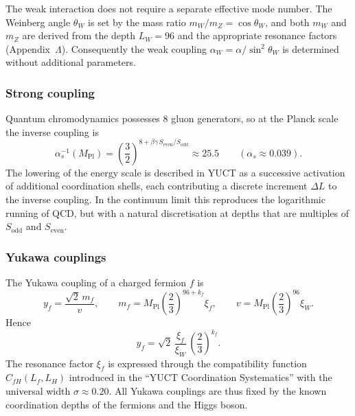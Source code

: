 \documentclass[12pt,a4paper]{article}
\begin{document}
	The weak interaction does not require a separate effective mode number.  The Weinberg angle
	\(\theta_W\) is set by the mass ratio \(m_W/m_Z = \cos\theta_W\), and both \(m_W\) and \(m_Z\)
	are derived from the depth \(L_W = 96\) and the appropriate resonance factors
	(Appendix~\(\Lambda\)).  Consequently the weak coupling \(\alpha_W = \alpha/\sin^2\theta_W\) is
	determined without additional parameters.
	
	\subsubsection{Strong coupling}
	
	Quantum chromodynamics possesses \(8\) gluon generators, so at the Planck scale the inverse
	coupling is
	\begin{equation}
		\alpha_s^{-1}(M_{\mathrm{Pl}}) = \left(\frac{3}{2}\right)^{\!8 + \beta\gamma\,S_{\mathrm{even}}/S_{\mathrm{odd}}}
		\approx 25.5 \qquad (\alpha_s \approx 0.039) .
	\end{equation}
	The lowering of the energy scale is described in YUCT as a successive activation of additional
	coordination shells, each contributing a discrete increment \(\Delta L\) to the inverse
	coupling.  In the continuum limit this reproduces the logarithmic running of QCD, but with a
	natural discretisation at depths that are multiples of \(S_{\mathrm{odd}}\) and
	\(S_{\mathrm{even}}\).
	
	\subsubsection{Yukawa couplings}
	
	The Yukawa coupling of a charged fermion \(f\) is
	\begin{equation}
		y_f = \frac{\sqrt{2}\,m_f}{v},
		\qquad
		m_f = M_{\mathrm{Pl}}\left(\frac{2}{3}\right)^{\!96+k_f}\xi_f,
		\qquad
		v   = M_{\mathrm{Pl}}\left(\frac{2}{3}\right)^{\!96}\xi_W .
	\end{equation}
	Hence
	\begin{equation}
		y_f = \sqrt{2}\,\frac{\xi_f}{\xi_W}\,\left(\frac{2}{3}\right)^{\!k_f} .
	\end{equation}
	The resonance factor \(\xi_f\) is expressed through the compatibility function
	\(C_{fH}(L_f,L_H)\) introduced in the ``YUCT Coordination Systematics'' with the universal
	width \(\sigma \approx 0.20\).  All Yukawa couplings are thus fixed by the known coordination
	depths of the fermions and the Higgs boson.
	
\end{document}

